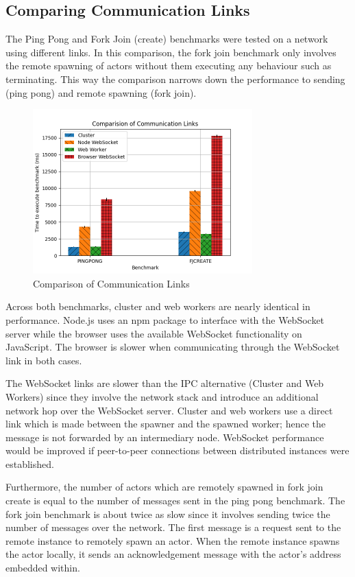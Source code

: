 \documentclass[12pt, a4paper]{report}
\theoremstyle{definition}
\theoremstyle{definition}%
\theoremstyle{definition}%
\theoremstyle{definition}%
\theoremstyle{definition}%
\theoremstyle{definition}%
\begin{document}
\subsection{Comparing Communication Links}
The Ping Pong and Fork Join (create) benchmarks were tested on a network using different links. In this comparison, the fork join benchmark only involves the remote spawning of actors without them executing any behaviour such as terminating. This way the comparison narrows down the performance to sending (ping pong) and remote spawning (fork join).
\begin{figure}[H]
    \begin{centering}
        \includegraphics[width=320px]{resources/link.png}
        \caption{Comparison of Communication Links}
    \end{centering}
\end{figure}
Across both benchmarks, cluster and web workers are nearly identical in performance. Node.js uses an npm package to interface with the WebSocket server while the browser uses the available WebSocket functionality on JavaScript. The browser is slower when communicating through the WebSocket link in both cases. 

The WebSocket links are slower than the IPC alternative (Cluster and Web Workers) since they involve the network stack and introduce an additional network hop over the WebSocket server. Cluster and web workers use a direct link which is made between the spawner and the spawned worker; hence the message is not forwarded by an intermediary node. WebSocket performance would be improved if peer-to-peer connections between distributed instances were established.

Furthermore, the number of actors which are remotely spawned in fork join create is equal to the number of messages sent in the ping pong benchmark. The fork join benchmark is about twice as slow since it involves sending twice the number of messages over the network. The first message is a request sent to the remote instance to remotely spawn an actor. When the remote instance spawns the actor locally, it sends an acknowledgement message with the actor's address embedded within.
\end{document}
